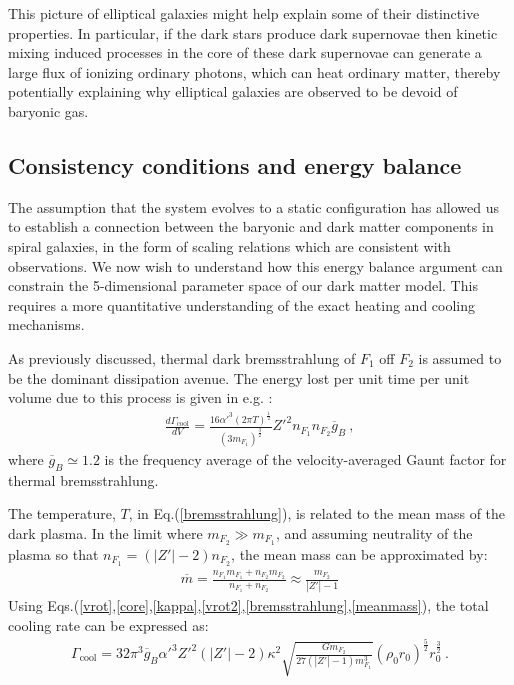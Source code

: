 \documentclass[12pt]{article}
\begin{document}
{{This picture of elliptical galaxies might help explain some of their distinctive properties. In particular, if the dark stars produce dark supernovae then kinetic mixing induced processes in the core of these dark supernovae can generate a large flux of ionizing ordinary photons, which can heat ordinary matter, thereby potentially explaining why elliptical galaxies are observed to be devoid of baryonic gas.

\subsection{Consistency conditions and energy balance}

The assumption that the system evolves to a static configuration has allowed us to establish a connection between the baryonic and dark matter components in spiral galaxies, in the form of scaling relations which are consistent with observations. We now wish to understand how this energy balance argument can constrain the 5-dimensional parameter space of our dark matter model. This requires a more quantitative understanding of the exact heating and cooling mechanisms.

As previously discussed, thermal dark bremsstrahlung of $F _1$ off $F _2$ is assumed to be the dominant dissipation avenue. The energy lost per unit time per unit volume due to this process is given in e.g. \cite{radiative}:
%
\begin{eqnarray}
\frac{d\Gamma _{\text{cool}}}{dV} = \frac{16 {\alpha '} ^3 (2\pi T) ^{\frac{1}{2}}}{(3 m _{F_1} ) ^{\frac{3}{2}}} {Z '} ^2 n _{F_1} n _{F_2} \overline{g} _B \ ,
\label{bremsstrahlung}
\end{eqnarray}
%
where $\overline{g} _B \simeq 1.2$ is the frequency average of the velocity-averaged Gaunt factor for thermal bremsstrahlung. 

The temperature, $T$, in Eq.(\ref{bremsstrahlung}), is related to the mean mass of the dark plasma. In the limit where $m _{F_2} \gg m _{F_1}$, and assuming neutrality of the plasma so that $n _{F_1} = (|Z'|-2)n _{F_2}$, the mean mass can be approximated by:
%
\begin{eqnarray}
\overline{m} = \frac{n _{F_1}m _{F_1} + n _{F_2}m _{F_2}}{n _{F_1} + n _{F_2}} \approx \frac{m _{F_2}}{|Z'|-1}
\label{meanmass}
\end{eqnarray}
%
Using Eqs.(\ref{vrot},\ref{core},\ref{kappa},\ref{vrot2},\ref{bremsstrahlung},\ref{meanmass}), the total cooling rate can be expressed as:
%
\begin{eqnarray}
\Gamma _{\text{cool}} = 32\pi ^3\overline{g} _B{\alpha '} ^3{Z'} ^2(|Z'|-2)\kappa ^2\sqrt{\frac{Gm _{F_2}}{27(|Z'|-1)m _{F_1} ^3}}\left ( \rho _0r _0 \right) ^{\frac{5}{2}}r _0 ^{\frac{3}{2}} \ .
\label{integratedout}
\end{eqnarray}
%

}}
\end{document}
